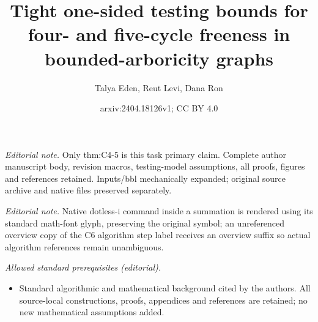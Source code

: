 \documentclass{article}
\title{Tight one-sided testing bounds for four- and five-cycle freeness in bounded-arboricity graphs}
\author{Talya Eden, Reut Levi, Dana Ron}
\date{arxiv:2404.18126v1; CC BY 4.0}
\begin{document}
\maketitle
\noindent\textit{Editorial note.} Only thm:C4-5 is this task primary claim. Complete author manuscript body, revision macros, testing-model assumptions, all proofs, figures and references retained. Inputs/bbl mechanically expanded; original source archive and native files preserved separately.\par\medskip
\noindent\textit{Editorial note.} Native dotless-i command inside a summation is rendered using its standard math-font glyph, preserving the original symbol; an unreferenced overview copy of the C6 algorithm step label receives an overview suffix so actual algorithm references remain unambiguous.\par\medskip
\noindent\textit{Allowed standard prerequisites (editorial).}\begin{itemize}
\item Standard algorithmic and mathematical background cited by the authors. All source-local constructions, proofs, appendices and references are retained; no new mathematical assumptions added.
\end{itemize}\medskip



\date{}
			
				
\end{document}

